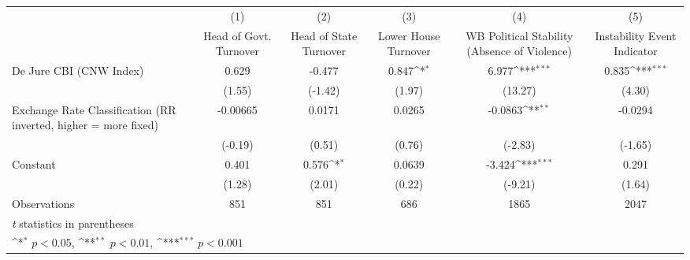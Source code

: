 {
\def\sym#1{\ifmmode^{#1}\else\(^{#1}\)\fi}
\begin{tabular}{l*{5}{c}}
\hline\hline
                &\multicolumn{1}{c}{(1)}&\multicolumn{1}{c}{(2)}&\multicolumn{1}{c}{(3)}&\multicolumn{1}{c}{(4)}&\multicolumn{1}{c}{(5)}\\
                &\multicolumn{1}{c}{Head of Govt. Turnover}&\multicolumn{1}{c}{Head of State Turnover}&\multicolumn{1}{c}{Lower House Turnover}&\multicolumn{1}{c}{WB Political Stability (Absence of Violence)}&\multicolumn{1}{c}{Instability Event Indicator}\\
\hline
De Jure CBI (CNW Index)&    0.629         &   -0.477         &    0.847\sym{*}  &    6.977\sym{***}&    0.835\sym{***}\\
                &   (1.55)         &  (-1.42)         &   (1.97)         &  (13.27)         &   (4.30)         \\
[1em]
Exchange Rate Classification (RR inverted, higher = more fixed)& -0.00665         &   0.0171         &   0.0265         &  -0.0863\sym{**} &  -0.0294         \\
                &  (-0.19)         &   (0.51)         &   (0.76)         &  (-2.83)         &  (-1.65)         \\
[1em]
Constant        &    0.401         &    0.576\sym{*}  &   0.0639         &   -3.424\sym{***}&    0.291         \\
                &   (1.28)         &   (2.01)         &   (0.22)         &  (-9.21)         &   (1.64)         \\
\hline
Observations    &      851         &      851         &      686         &     1865         &     2047         \\
\hline\hline
\multicolumn{6}{l}{\footnotesize \textit{t} statistics in parentheses}\\
\multicolumn{6}{l}{\footnotesize \sym{*} \(p<0.05\), \sym{**} \(p<0.01\), \sym{***} \(p<0.001\)}\\
\end{tabular}
}
